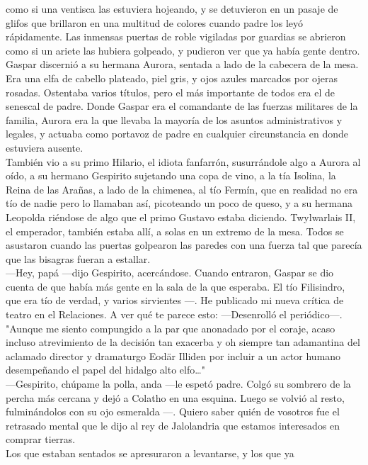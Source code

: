 \documentclass[
  letterpaper,
]{krantz}
\begin{document}
como si una ventisca las estuviera hojeando, y se detuvieron en un
pasaje de glifos que brillaron en una multitud de colores cuando padre
los leyó rápidamente. Las inmensas puertas de roble vigiladas por
guardias se abrieron como si un ariete las hubiera golpeado, y pudieron
ver que ya había gente dentro.\\
Gaspar discernió a su hermana Aurora, sentada a lado de la cabecera de
la mesa. Era una elfa de cabello plateado, piel gris, y ojos azules
marcados por ojeras rosadas. Ostentaba varios títulos, pero el más
importante de todos era el de senescal de padre. Donde Gaspar era el
comandante de las fuerzas militares de la familia, Aurora era la que
llevaba la mayoría de los asuntos administrativos y legales, y actuaba
como portavoz de padre en cualquier circunstancia en donde estuviera
ausente.\\
También vio a su primo Hilario, el idiota fanfarrón, susurrándole algo a
Aurora al oído, a su hermano Gespirito sujetando una copa de vino, a la
tía Isolina, la Reina de las Arañas, a lado de la chimenea, al tío
Fermín, que en realidad no era tío de nadie pero lo llamaban así,
picoteando un poco de queso, y a su hermana Leopolda riéndose de algo
que el primo Gustavo estaba diciendo. Twylwarlais II, el emperador,
también estaba allí, a solas en un extremo de la mesa. Todos se
asustaron cuando las puertas golpearon las paredes con una fuerza tal
que parecía que las bisagras fueran a estallar.\\
---Hey, papá ---dijo Gespirito, acercándose. Cuando entraron, Gaspar se
dio cuenta de que había más gente en la sala de la que esperaba. El tío
Filisindro, que era tío de verdad, y varios sirvientes ---. He publicado
mi nueva crítica de teatro en el Relaciones. A ver qué te parece esto:
---Desenrolló el periódico---. "Aunque me siento compungido a la par que
anonadado por el coraje, acaso incluso atrevimiento de la decisión tan
exacerba y oh siempre tan adamantina del aclamado director y dramaturgo
Eodär Illiden por incluir a un actor humano desempeñando el papel del
hidalgo alto elfo\ldots"\\
---Gespirito, chúpame la polla, anda ---le espetó padre. Colgó su
sombrero de la percha más cercana y dejó a Colatho en una esquina. Luego
se volvió al resto, fulminándolos con su ojo esmeralda ---. Quiero saber
quién de vosotros fue el retrasado mental que le dijo al rey de
Jalolandria que estamos interesados en comprar tierras.\\
Los que estaban sentados se apresuraron a levantarse, y los que ya
\end{document}
